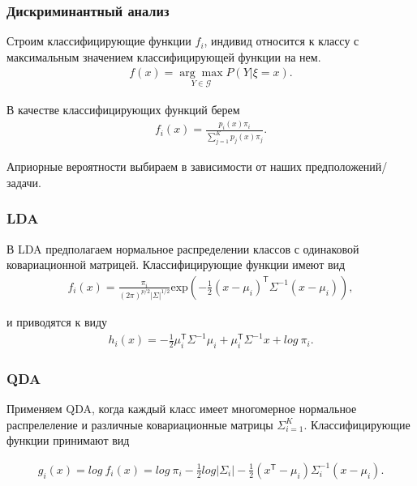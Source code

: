 \documentclass[11pt]{beamer}
\begin{document}
	\begin{frame}
	\frametitle{Дискриминантный анализ}
	
	
	Строим классифицирующие функции $f_i$, индивид относится к классу с максимальным значением классифицирующей функции на нем. 
		\begin{eqnarray}\label{classification_1}  
		f(x) = \underset{{Y \in \mathcal{G}}}{\arg \max}  P (Y \vert \xi = x). 
		\end{eqnarray}
	
	\bigskip
	
	В качестве классифицирующих функций берем
	\begin{eqnarray}\label{Discr_functions}  
		f_i (x) = \frac {p_i(x) \pi_i}{\sum_{j=1}^{K} p_j (x) \pi_j}. 
	\end{eqnarray}

	Априорные вероятности выбираем в зависимости от наших предположений/задачи.

	\end{frame}

	\begin{frame}
	\frametitle{LDA}
	
	В LDA предполагаем нормальное распределении классов с одинаковой ковариационной матрицей. Классифицирующие функции имеют вид
	\begin{eqnarray}\label{LDA}  
		f_i (x) = \frac {\pi_i}{(2\pi)^{p/2} \vert \Sigma \vert ^{1/2}} \textrm{exp} \left(-\frac{1}{2}(x-\mu_i)^\mathsf{T}\Sigma^{-1}(x-\mu_i)\right), 
	\end{eqnarray}
	
	\bigskip
		
	и приводятся к виду 
	\begin{eqnarray}\label{LDA}  
		h_i (x) = - \frac{1}{2} \mu_{i}^\mathsf{T} \Sigma^{-1} \mu_i + \mu_{i}^\mathsf{T} \Sigma^{-1}x + log \ \pi_i.
	\end{eqnarray}

	
	\end{frame}

	\begin{frame}
	\frametitle{QDA}
	
	Применяем QDA, когда каждый класс имеет многомерное нормальное распрелеление и различные ковариационные матрицы $\Sigma_{i=1}^K$. Классифицирующие функции принимают вид 
	
	\begin{eqnarray}\label{QDA}  
		g_i (x) = log \ f_i(x) = log \ \pi_i - \frac{1}{2} log \vert \Sigma_i \vert - \frac{1}{2} (x^\mathsf{T} - \mu_i) \Sigma_{i}^{-1} (x-\mu_i).
	\end{eqnarray}
	
	\end{frame}
\end{document}
